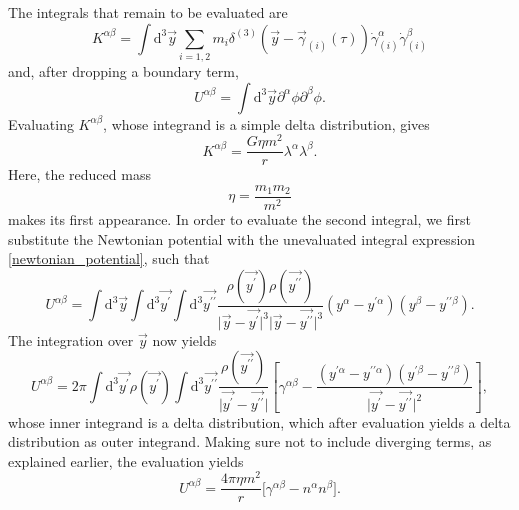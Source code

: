 The integrals that remain to be evaluated are
\begin{equation}
  K^{\alpha\beta} = \int\mathrm d^3\vec y\sum_{i=1,2}m_i\delta^{(3)}(\vec y-\vec\gamma_{(i)}(\tau))\dot\gamma^\alpha_{(i)}\dot\gamma^\beta_{(i)}
\end{equation}
and, after dropping a boundary term,
\begin{equation}
    U^{\alpha\beta} = \int\mathrm d^3\vec y\partial^\alpha\phi\partial^\beta\phi.
\end{equation}
Evaluating $K^{\alpha\beta}$, whose integrand is a simple delta distribution, gives
\begin{equation}
  K^{\alpha\beta} = \frac{G\eta m^2}{r}\lambda^\alpha\lambda^\beta.
\end{equation}
Here, the reduced mass
\begin{equation}
  \eta = \frac{m_1m_2}{m^2}
\end{equation}
makes its first appearance. In order to evaluate the second integral, we first substitute the Newtonian potential with the unevaluated integral expression \eqref{newtonian_potential}, such that
\begin{equation}
  U^{\alpha\beta} = \int\mathrm d^3\vec y\int\mathrm d^3\vec{y^\prime}\int\mathrm d^3\vec{y^{\prime\prime}} \frac{\rho(\vec{y^\prime})\rho(\vec{y^{\prime\prime}})}{\lvert\vec y-\vec{y^\prime}\rvert^3 \lvert\vec y-\vec{y^{\prime\prime}}\rvert^3} (y^\alpha - y^{\prime\alpha}) (y^\beta - y^{\prime\prime\beta}).
\end{equation}
The integration over $\vec y$ now yields
\begin{equation}
  U^{\alpha\beta} = 2\pi \int\mathrm d^3\vec{y^\prime} \rho(\vec{y^\prime}) \int\mathrm d^3\vec{y^{\prime\prime}}\frac{\rho(\vec{y^{\prime\prime}})}{\lvert\vec{y^\prime}-\vec{y^{\prime\prime}}\rvert} \left\lbrack \gamma^{\alpha\beta} - \frac{(y^{\prime\alpha} - y^{\prime\prime\alpha})(y^{\prime\beta} - y^{\prime\prime\beta})}{\lvert\vec{y^\prime}-\vec{y^{\prime\prime}}\rvert^2}\right\rbrack,
\end{equation}
whose inner integrand is a delta distribution, which after evaluation yields a delta distribution as outer integrand. Making sure not to include diverging terms, as explained earlier, the evaluation yields
\begin{equation}
  U^{\alpha\beta} = \frac{4\pi\eta m^2}{r}\lbrack\gamma^{\alpha\beta} - n^\alpha n^\beta\rbrack.
\end{equation}

